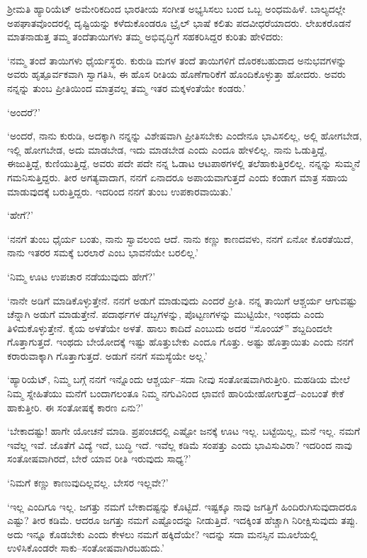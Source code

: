 ಶ‍್ರೀಮತಿ ಹ್ಯಾರಿಯೆಟ್ ಅಮೇರಿಕದಿಂದ ಭಾರತೀಯ ಸಂಗೀತ ಅಭ್ಯಸಿಸಲು ಬಂದ ಒಬ್ಬ ಅಂಧಮಹಿಳೆ. ಬಾಲ್ಯದಲ್ಲೇ ಅಪಘಾತವೊಂದರಲ್ಲಿ ದೃಷ್ಟಿಯನ್ನು ಕಳೆದುಕೊಂಡರೂ ಬ್ರೈಲ್ ಭಾಷೆ ಕಲಿತು ಪದವೀಧರೆಯಾದರು. ಲೇಖಕರೊಡನೆ ಮಾತನಾಡುತ್ತ ತಮ್ಮ ತಂದೆತಾಯಿಗಳು ತಮ್ಮ ಅಭಿವೃದ್ಧಿಗೆ ಸಹಕರಿಸಿದ್ದರ ಕುರಿತು ಹೇಳಿದರು:

‘ನಮ್ಮ ತಂದೆ ತಾಯಿಗಳು ಧೈರ್ಯಸ್ಥರು. ಕುರುಡಿ ಮಗಳ ತಂದೆ ತಾಯಿಗಳಿಗೆ ದೊರಕ\-ಬಹು\-ದಾದ ಅನುಭವಗಳನ್ನು ಅವರು ಹೃತ್ಪೂರ್ವಕವಾಗಿ ಸ್ವಾಗತಿಸಿ, ಈ ಹೊಸ ರೀತಿಯ ಹೊಣೆಗಾರಿಕೆಗೆ ಹೊಂದಿಕೊಳ್ಳುತ್ತಾ ಹೋದರು. ಅವರು ನನ್ನನ್ನು ತುಂಬ ಪ್ರೀತಿಯಿಂದ ಮಾತ್ರವಲ್ಲ ತಮ್ಮ ಇತರ ಮಕ್ಕಳಂತೆಯೇ ಕಂಡರು.’

‘ಅಂದರೆ?’

‘ಅಂದರೆ, ನಾನು ಕುರುಡಿ, ಅದಕ್ಕಾಗಿ ನನ್ನನ್ನು ವಿಶೇಷವಾಗಿ ಪ್ರೀತಿಸಬೇಕು ಎಂದೇನೂ ಭಾವಿಸಲಿಲ್ಲ, ಅಲ್ಲಿ ಹೋಗಬೇಡ, ಇಲ್ಲಿ ಹೋಗಬೇಡ, ಅದು ಮಾಡಬೇಡ, ಇದು ಮಾಡಬೇಡ ಎಂದು ಎಂದೂ ಹೇಳಲಿಲ್ಲ. ನಾನು ಓಡುತ್ತಿದ್ದೆ, ಈಜುತ್ತಿದ್ದೆ, ಕುಣಿಯುತ್ತಿದ್ದೆ, ಅವರು ಪದೇ ಪದೇ ನನ್ನ ಓಡಾಟ ಆಟಪಾಠಗಳಲ್ಲಿ ತಲೆಹಾಕುತ್ತಿರಲಿಲ್ಲ. ನನ್ನನ್ನು ಸುಮ್ಮನೆ ಗಮನಿಸುತ್ತಿದ್ದರು. ತೀರ ಅಗತ್ಯವಾದಾಗ, ನನಗೆ ಏನಾದರೂ ಅಪಾಯವಾಗುತ್ತದೆ ಎಂದು ಕಂಡಾಗ ಮಾತ್ರ ಸಹಾಯ ಮಾಡುವುದಕ್ಕೆ ಬರುತ್ತಿದ್ದರು. ಇದರಿಂದ ನನಗೆ ತುಂಬ ಉಪಕಾರವಾಯಿತು.’

‘ಹೇಗೆ?’

‘ನನಗೆ ತುಂಬ ಧೈರ್ಯ ಬಂತು, ನಾನು ಸ್ವಾವಲಂಬಿ ಆದೆ. ನಾನು ಕಣ್ಣು ಕಾಣ\-ದವಳು, ನನಗೆ ಏನೋ ಕೊರತೆಯಿದೆ, ನಾನು ಇತರರ ಸಮಕ್ಕೆ ಬರಲಾರೆ ಎಂಬ ಭಾವನೆಯೇ ಬರಲಿಲ್ಲ.’

‘ನಿಮ್ಮ ಊಟ ಉಪಚಾರ ನಡೆಯುವುದು ಹೇಗೆ?’

‘ನಾನೇ ಅಡಿಗೆ ಮಾಡಿಕೊಳ್ಳುತ್ತೇನೆ. ನನಗೆ ಅಡುಗೆ ಮಾಡುವುದು ಎಂದರೆ ಪ್ರೀತಿ. ನನ್ನ ತಾಯಿಗೆ ಆಶ್ಚರ್ಯ ಆಗುವಷ್ಟು ಚೆನ್ನಾಗಿ ಅಡುಗೆ ಮಾಡುತ್ತೇನೆ. ಪದಾರ್ಥಗಳ ಡಬ್ಬಗಳನ್ನು, ಪೊಟ್ಟಣಗಳನ್ನು ಮುಟ್ಟಿಯೇ, ಇಂಥದು ಎಂದು ತಿಳಿದುಕೊಳ್ಳುತ್ತೇನೆ. ಕೈಯ ಅಳತೆಯೇ ಅಳತೆ. ಹಾಲು ಕಾದಿದೆ ಎಂಬುದು ಅದರ “ಸೊಂಯ್​” ಶಬ್ದದಿಂದಲೇ ಗೊತ್ತಾಗುತ್ತದೆ. ಇಂಥದು ಬೇಯೋದಕ್ಕೆ ಇಷ್ಟು ಹೊತ್ತುಬೇಕು ಎಂದೂ ಗೊತ್ತು. ಅಷ್ಟು ಹೊತ್ತಾಯಿತು ಎಂದು ನನಗೆ ಕರಾರುವಾಕ್ಕಾಗಿ ಗೊತ್ತಾಗುತ್ತದೆ. ಅಡುಗೆ ನನಗೆ ಸಮಸ್ಯೆಯೇ ಅಲ್ಲ.’

‘ಹ್ಯಾರಿಯೆಟ್, ನಿಮ್ಮ ಬಗ್ಗೆ ನನಗೆ ಇನ್ನೊಂದು ಆಶ್ಚರ್ಯ–ಸದಾ ನೀವು ಸಂತೋಷ\-ವಾಗಿರು\-ತ್ತೀರಿ. ಮಹಡಿಯ ಮೇಲೆ ನಿಮ್ಮ ಸ್ನೇಹಿತೆಯು ಮನೆಗೆ ಬಂದಾಗಲಂತೂ ನಿಮ್ಮ ನಗುವಿನಿಂದ ಛಾವಣಿ ಹಾರಿಯೇಹೋಗುತ್ತದೆ–ಎಂಬಂತೆ ಕೇಕೆ ಹಾಕುತ್ತೀರಿ. ಈ ಸಂತೋಷಕ್ಕೆ ಕಾರಣ ಏನು?’

‘ಬೇಕಾದಷ್ಟು! ಹಾಗೇ ಯೋಚನೆ ಮಾಡಿ. ಪ್ರಪಂಚದಲ್ಲಿ ಎಷ್ಟೋ ಜನಕ್ಕೆ ಊಟ ಇಲ್ಲ. ಬಟ್ಟೆಯಿಲ್ಲ, ಮನೆ ಇಲ್ಲ. ನಮಗೆ ಇವೆಲ್ಲ ಇವೆ. ಜೊತೆಗೆ ವಿದ್ಯೆ ಇದೆ, ಬುದ್ಧಿ ಇದೆ. ಇವೆಲ್ಲ ಕಡಿಮೆ ಸಂಪತ್ತು ಎಂದು ಭಾವಿಸುವಿರಾ? ಇದರಿಂದ ನಾವು ಸಂತೋಷವಾಗಿರದೆ, ಬೇರೆ ಯಾವ ರೀತಿ ಇರುವುದು ಸಾಧ್ಯ?’

‘ನಿಮಗೆ ಕಣ್ಣು ಕಾಣುವುದಿಲ್ಲವಲ್ಲ. ಬೇಸರ ಇಲ್ಲವೇ?’

‘ಇಲ್ಲ ಎಂದಿಗೂ ಇಲ್ಲ. ಜಗತ್ತು ನಮಗೆ ಬೇಕಾದಷ್ಟನ್ನು ಕೊಟ್ಟಿದೆ. ಇಷ್ಟಕ್ಕೂ ನಾವು ಜಗತ್ತಿಗೆ ಹಿಂದಿರುಗಿಸುವುದಾದರೂ ಎಷ್ಟು? ತೀರ ಕಡಿಮೆ. ಆದರೂ ಜಗತ್ತು ನಮಗೆ ಎಷ್ಟೊಂದನ್ನು ನೀಡುತ್ತಿದೆ. ಇದಕ್ಕಿಂತ ಹೆಚ್ಚಾಗಿ ನಿರೀಕ್ಷಿಸುವುದು ತಪ್ಪು. ಅದು ಇನ್ನೂ ಕೊಡಬೇಕು ಎಂದು ಕೇಳಲು ನಮಗೆ ಹಕ್ಕಿದೆಯೇ? ಇದನ್ನು ಸದಾ ಮನಸ್ಸಿನ ಮೂಲೆಯಲ್ಲಿ ಉಳಿಸಿಕೊಂಡರೇ ಸಾಕು–ಸಂತೋಷವಾಗಿರಬಹುದು.’

